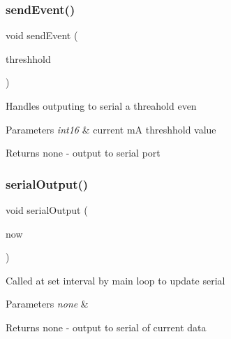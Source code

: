 \subsubsection{\texorpdfstring{send\+Event()}{sendEvent()}}
{\footnotesize\ttfamily void send\+Event (\begin{DoxyParamCaption}\item[{int16\+\_\+t}]{threshhold }\end{DoxyParamCaption})}

Handles outputing to serial a threahold even


\begin{DoxyParams}{Parameters}
{\em int16} & current mA threshhold value \\
\hline
\end{DoxyParams}
\begin{DoxyReturn}{Returns}
none -\/ output to serial port 
\end{DoxyReturn}
\hypertarget{_u_s_b___tester___o_l_e_d__128x64___beta__2_82_8ino_a431572c740fc323bf08804590b227ea2}{}\label{_u_s_b___tester___o_l_e_d__128x64___beta__2_82_8ino_a431572c740fc323bf08804590b227ea2} 
\subsubsection{\texorpdfstring{serial\+Output()}{serialOutput()}}
{\footnotesize\ttfamily void serial\+Output (\begin{DoxyParamCaption}\item[{long}]{now }\end{DoxyParamCaption})}

Called at set interval by main loop to update serial


\begin{DoxyParams}{Parameters}
{\em none} & \\
\hline
\end{DoxyParams}
\begin{DoxyReturn}{Returns}
none -\/ output to serial of current data 
\end{DoxyReturn}
\hypertarget{_u_s_b___tester___o_l_e_d__128x64___beta__2_82_8ino_a585260c6f45b8f5971f28ac53e269bfa}{}\label{_u_s_b___tester___o_l_e_d__128x64___beta__2_82_8ino_a585260c6f45b8f5971f28ac53e269bfa} 
